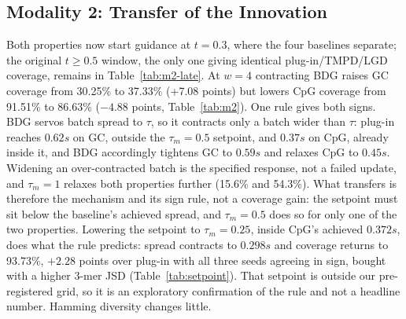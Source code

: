 \documentclass{article}
\begin{document}
\subsection{Modality 2: Transfer of the Innovation}\label{sec:m2}
Both properties now start guidance at $t=0.3$, where the four baselines separate; the original $t\ge0.5$ window, the only one giving identical plug-in/TMPD/LGD coverage, remains in Table~\ref{tab:m2-late}. At $w=4$ contracting BDG raises GC coverage from 30.25\% to 37.33\% (+7.08 points) but lowers CpG coverage from 91.51\% to 86.63\% ($-4.88$ points, Table~\ref{tab:m2}). One rule gives both signs. BDG servos batch spread to $\tau$, so it contracts only a batch wider than $\tau$: plug-in reaches $0.62s$ on GC, outside the $\tau_m=0.5$ setpoint, and $0.37s$ on CpG, already inside it, and BDG accordingly tightens GC to $0.59s$ and relaxes CpG to $0.45s$. Widening an over-contracted batch is the specified response, not a failed update, and $\tau_m=1$ relaxes both properties further (15.6\% and 54.3\%). What transfers is therefore the mechanism and its sign rule, not a coverage gain: the setpoint must sit below the baseline's achieved spread, and $\tau_m=0.5$ does so for only one of the two properties. Lowering the setpoint to $\tau_m=0.25$, inside CpG's achieved $0.372s$, does what the rule predicts: spread contracts to $0.298s$ and coverage returns to 93.73\%, $+2.28$ points over plug-in with all three seeds agreeing in sign, bought with a higher 3-mer JSD (Table~\ref{tab:setpoint}). That setpoint is outside our pre-registered grid, so it is an exploratory confirmation of the rule and not a headline number. Hamming diversity changes little.
\end{document}
